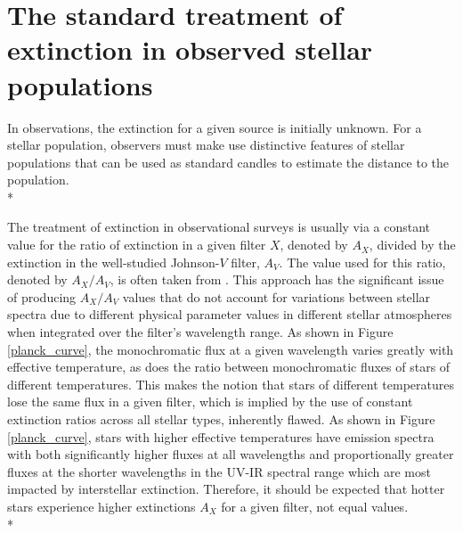 \documentclass[12pt, a4paper]{report}
\begin{document}
\section{The standard treatment of extinction in observed stellar populations} \label{standard_ext}

In observations, the extinction for a given source is initially unknown. For a stellar population, observers must make use distinctive features of stellar populations that can be used as standard candles to estimate the distance to the population. \\*

The treatment of extinction in observational surveys is usually via a constant value for the ratio of extinction in a given filter $X$, denoted by $A_{X}$, divided by the extinction in the well-studied Johnson-$V$ filter, $A_{V}$. The value used for this ratio, denoted by $A_{X}/A_{V}$, is often taken from \cite{1985ApJ...288..618R}. This approach has the significant issue of producing $A_{X}/A_{V}$ values that do not account for  variations between stellar spectra due to different physical parameter values in different stellar atmospheres when integrated over the filter's wavelength range. As shown in Figure \ref{planck_curve}, the monochromatic flux at a given wavelength varies greatly with effective temperature, as does the ratio between monochromatic fluxes of stars of different temperatures. This makes the notion that stars of different temperatures lose the same flux in a given filter, which is implied by the use of constant extinction ratios across all stellar types, inherently flawed. As shown in Figure \ref{planck_curve}, stars with higher effective temperatures have emission spectra with both significantly higher fluxes at all wavelengths and proportionally greater fluxes at the shorter wavelengths in the UV-IR spectral range which are most impacted by interstellar extinction. Therefore, it should be expected that hotter stars experience higher extinctions $A_{X}$ for a given filter, not equal values.\\*
\end{document}
